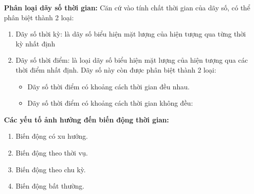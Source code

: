 \textbf{Phân loại dãy số thời gian:}
Căn cứ vào tính chất thời gian của dãy số, có thể phân biệt thành 2 loại:
\begin{enumerate}
    \item Dãy số thời kỳ: là dãy số biểu hiện mặt lượng của hiện tượng qua từng thời kỳ nhất định
    \item Dãy số thời điểm: là loại dãy số biểu hiện mặt lượng của hiện tượng qua các thời điểm nhất định. Dãy số này còn được phân biệt thành 2 loại:
    \begin{itemize}
        \item Dãy số thời điểm có khoảng cách thời gian đều nhau. \\
        \item Dãy số thời điểm có khoảng cách thời gian không đều:
    \end{itemize}
\end{enumerate}


\textbf{Các yếu tố ảnh hưởng đến biến động thời gian:}\
\begin{enumerate}
    \item Biến động có xu hướng. \\
    \item Biến động theo thời vụ. \\
    \item Biến động theo chu kỳ. \\
    \item Biến động bất thường. \\
\end{enumerate}

